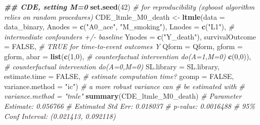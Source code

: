 \documentclass[
]{book}
\newenvironment{Shaded}{\begin{snugshade}}{\end{snugshade}}
\newcommand{\AttributeTok}[1]{\textcolor[rgb]{0.13,0.29,0.53}{#1}}
\newcommand{\CommentTok}[1]{\textcolor[rgb]{0.56,0.35,0.01}{\textit{#1}}}
\newcommand{\ConstantTok}[1]{\textcolor[rgb]{0.56,0.35,0.01}{#1}}
\newcommand{\DecValTok}[1]{\textcolor[rgb]{0.00,0.00,0.81}{#1}}
\newcommand{\DocumentationTok}[1]{\textcolor[rgb]{0.56,0.35,0.01}{\textbf{\textit{#1}}}}
\newcommand{\FunctionTok}[1]{\textcolor[rgb]{0.13,0.29,0.53}{\textbf{#1}}}
\newcommand{\NormalTok}[1]{#1}
\newcommand{\OtherTok}[1]{\textcolor[rgb]{0.56,0.35,0.01}{#1}}
\newcommand{\StringTok}[1]{\textcolor[rgb]{0.31,0.60,0.02}{#1}}
\begin{document}
\begin{Shaded}
\begin{Highlighting}[]
\DocumentationTok{\#\# CDE, setting M=0}
\FunctionTok{set.seed}\NormalTok{(}\DecValTok{42}\NormalTok{) }\CommentTok{\# for reproducibility (xgboost algorithm relies on random procedures)}
\NormalTok{CDE\_ltmle\_M0\_death }\OtherTok{\textless{}{-}} \FunctionTok{ltmle}\NormalTok{(}\AttributeTok{data =}\NormalTok{ data\_binary,}
                            \AttributeTok{Anodes =} \FunctionTok{c}\NormalTok{(}\StringTok{"A0\_ace"}\NormalTok{, }\StringTok{"M\_smoking"}\NormalTok{),}
                            \AttributeTok{Lnodes =} \FunctionTok{c}\NormalTok{(}\StringTok{"L1"}\NormalTok{), }\CommentTok{\# intermediate confounders +/{-} baseline}
                            \AttributeTok{Ynodes =} \FunctionTok{c}\NormalTok{(}\StringTok{"Y\_death"}\NormalTok{),}
                            \AttributeTok{survivalOutcome =} \ConstantTok{FALSE}\NormalTok{, }\CommentTok{\# TRUE for time{-}to{-}event outcomes Y}
                            \AttributeTok{Qform =}\NormalTok{ Qform,}
                            \AttributeTok{gform =}\NormalTok{ gform,}
                            \AttributeTok{abar =} \FunctionTok{list}\NormalTok{(}\FunctionTok{c}\NormalTok{(}\DecValTok{1}\NormalTok{,}\DecValTok{0}\NormalTok{), }\CommentTok{\# counterfactual intervention do(A=1,M=0)}
                                        \FunctionTok{c}\NormalTok{(}\DecValTok{0}\NormalTok{,}\DecValTok{0}\NormalTok{)), }\CommentTok{\# counterfactual intervention do(A=0,M=0)}
                            \AttributeTok{SL.library =}\NormalTok{ SL.library,}
                            \AttributeTok{estimate.time =} \ConstantTok{FALSE}\NormalTok{, }\CommentTok{\# estimate computation time?}
                            \AttributeTok{gcomp =} \ConstantTok{FALSE}\NormalTok{,}
                            \AttributeTok{variance.method =} \StringTok{"ic"}\NormalTok{) }\CommentTok{\# a more robust variance can}
                                                    \CommentTok{\# be estimated with}
                                                    \CommentTok{\# variance.method = "tmle"}
\FunctionTok{summary}\NormalTok{(CDE\_ltmle\_M0\_death)}
\CommentTok{\# Parameter Estimate:  0.056766}
\CommentTok{\#  Estimated Std Err:  0.018037}
\CommentTok{\#            p{-}value:  0.0016488}
\CommentTok{\#  95\% Conf Interval: (0.021413, 0.092118)}


\end{Highlighting}
\end{Shaded}
\end{document}
